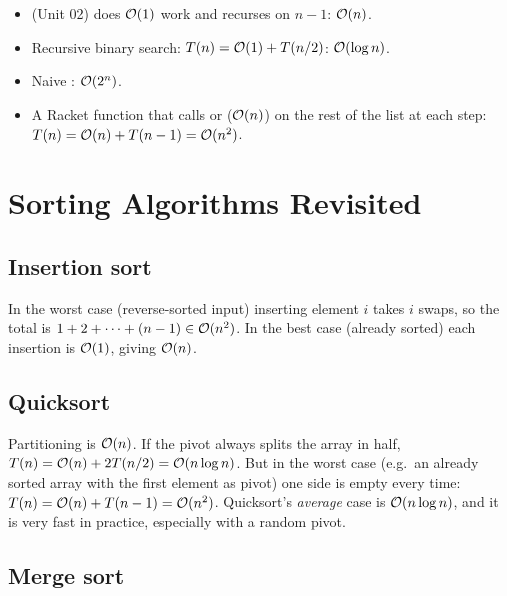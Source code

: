 \begin{example}
\begin{itemize}
  \item {} (Unit 02) does $\mathcal{O}(1)$ work and recurses on $n-1$: $\mathcal{O}(n)$.
  \item Recursive binary search: $T(n) = \mathcal{O}(1) + T(n/2)$: $\mathcal{O}(\log n)$.
  \item Naive : $\mathcal{O}(2^n)$.
  \item A Racket function that calls  or  ($\mathcal{O}(n)$) on the rest of
    the list at each step: $T(n) = \mathcal{O}(n) + T(n-1) = \mathcal{O}(n^2)$.
\end{itemize}
\end{example}

\section{Sorting Algorithms Revisited}

\subsection{Insertion sort}

In the worst case (reverse-sorted input) inserting element $i$ takes $i$ swaps, so the total is
$1 + 2 + \dots + (n-1) \in \mathcal{O}(n^2)$. In the best case (already sorted) each insertion is
$\mathcal{O}(1)$, giving $\mathcal{O}(n)$.

\subsection{Quicksort}

Partitioning is $\mathcal{O}(n)$. If the pivot always splits the array in half,
$T(n) = \mathcal{O}(n) + 2T(n/2) = \mathcal{O}(n \log n)$. But in the worst case (e.g.\ an already sorted array
with the first element as pivot) one side is empty every time: $T(n) = \mathcal{O}(n) + T(n-1) =
\mathcal{O}(n^2)$. Quicksort's \emph{average} case is $\mathcal{O}(n \log n)$, and it is very fast in practice,
especially with a random pivot.

\subsection{Merge sort}

